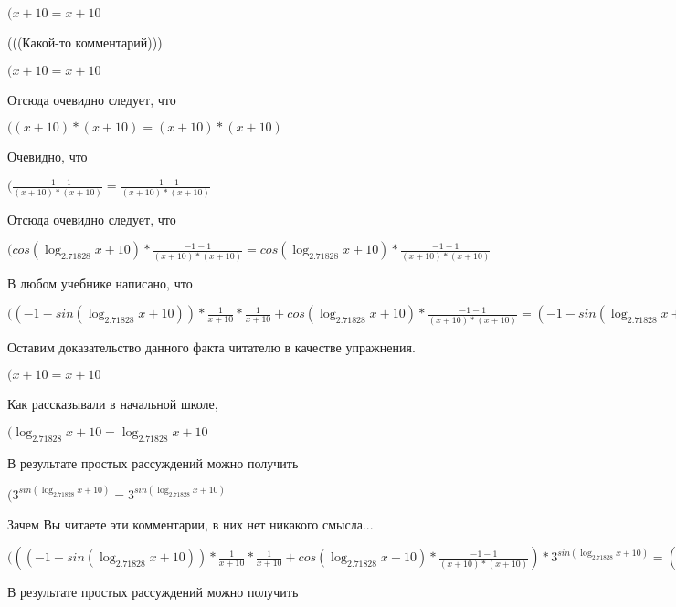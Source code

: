 \documentclass[12pt,a4paper,fleqn]{article}
\theoremstyle{definition}
\begin{document}
$( x  +  10  =  x  +  10 $

(((Какой-то комментарий)))

$( x  +  10  =  x  +  10 $

Отсюда очевидно следует, что

$(( x  +  10 ) * ( x  +  10 ) = ( x  +  10 ) * ( x  +  10 )$

Очевидно, что

$(\frac{ -1  -  1 }{( x  +  10 ) * ( x  +  10 )}
 = \frac{ -1  -  1 }{( x  +  10 ) * ( x  +  10 )}
$

Отсюда очевидно следует, что

$(cos(\log_{ 2.71828 }{ x  +  10 }) * \frac{ -1  -  1 }{( x  +  10 ) * ( x  +  10 )}
 = cos(\log_{ 2.71828 }{ x  +  10 }) * \frac{ -1  -  1 }{( x  +  10 ) * ( x  +  10 )}
$

В любом учебнике написано, что

$(( -1  - sin(\log_{ 2.71828 }{ x  +  10 })) * \frac{ 1 }{ x  +  10 }
 * \frac{ 1 }{ x  +  10 }
 + cos(\log_{ 2.71828 }{ x  +  10 }) * \frac{ -1  -  1 }{( x  +  10 ) * ( x  +  10 )}
 = ( -1  - sin(\log_{ 2.71828 }{ x  +  10 })) * \frac{ 1 }{ x  +  10 }
 * \frac{ 1 }{ x  +  10 }
 + cos(\log_{ 2.71828 }{ x  +  10 }) * \frac{ -1  -  1 }{( x  +  10 ) * ( x  +  10 )}
$

Оставим доказательство данного факта читателю в качестве упражнения.

$( x  +  10  =  x  +  10 $

Как рассказывали в начальной школе,

$(\log_{ 2.71828 }{ x  +  10 } = \log_{ 2.71828 }{ x  +  10 }$

В результате простых рассуждений можно получить

$({ 3 }^{sin(\log_{ 2.71828 }{ x  +  10 })} = { 3 }^{sin(\log_{ 2.71828 }{ x  +  10 })}$

Зачем Вы читаете эти комментарии, в них нет никакого смысла...

$((( -1  - sin(\log_{ 2.71828 }{ x  +  10 })) * \frac{ 1 }{ x  +  10 }
 * \frac{ 1 }{ x  +  10 }
 + cos(\log_{ 2.71828 }{ x  +  10 }) * \frac{ -1  -  1 }{( x  +  10 ) * ( x  +  10 )}
) * { 3 }^{sin(\log_{ 2.71828 }{ x  +  10 })} = (( -1  - sin(\log_{ 2.71828 }{ x  +  10 })) * \frac{ 1 }{ x  +  10 }
 * \frac{ 1 }{ x  +  10 }
 + cos(\log_{ 2.71828 }{ x  +  10 }) * \frac{ -1  -  1 }{( x  +  10 ) * ( x  +  10 )}
) * { 3 }^{sin(\log_{ 2.71828 }{ x  +  10 })}$

В результате простых рассуждений можно получить
\end{document}
